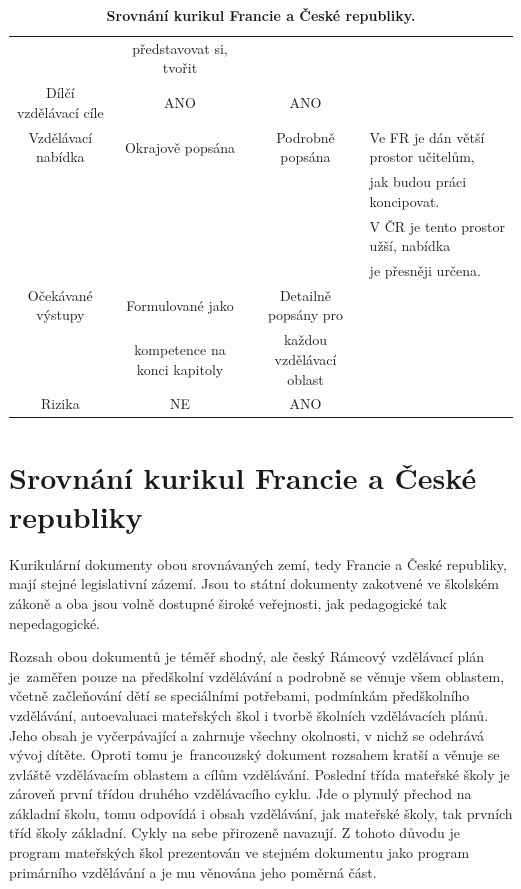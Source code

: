 \begin{landscape}
\begin{table}[t]
\begin{tabular}{|c|c|c|l|}
\rowcolor{grey!10}
					& představovat si, tvořit 	&						& 	\\		
\rowcolor{grey!50}
Dílčí vzdělávací cíle	& ANO					& ANO 					& 	\\	
\rowcolor{grey!10}
Vzdělávací nabídka	& Okrajově popsána	 		& Podrobně popsána	 	& Ve FR je dán větší prostor učitelům, 	\\
\rowcolor{grey!10}
					&							&						& jak budou práci koncipovat. 			\\
\rowcolor{grey!10}
					&							&						& V ČR je tento prostor užší, nabídka 	\\
\rowcolor{grey!10}
					&							&						& je přesněji určena. 					\\
\rowcolor{grey!50}
Očekávané výstupy	& Formulované jako 				& Detailně popsány pro 		& 		\\ 
\rowcolor{grey!50}
					& kompetence na konci kapitoly 	& každou vzdělávací oblast 	& 		\\
\rowcolor{grey!10}
Rizika	 			& NE						& ANO	 						& 		\\
\hline
\end{tabular}
\caption{ \textbf{Srovnání kurikul Francie a České republiky.}
}
\label{tab:srovnaniKurikul}
\end{table}
\end{landscape}

\section{Srovnání kurikul Francie a České republiky}
\label{srovnanikurikulfrcr}

	Kurikulární dokumenty obou srovnávaných zemí, tedy Francie a České republiky, mají stejné legislativní zázemí. Jsou to státní dokumenty zakotvené ve školském zákoně a oba jsou volně dostupné široké veřejnosti, jak pedagogické tak nepedagogické. 

	Rozsah obou dokumentů je téměř shodný, ale český Rámcový vzdělávací plán je zaměřen pouze na předškolní vzdělávání a podrobně se věnuje všem oblastem, včetně začleňování dětí se speciálními potřebami, podmínkám předškolního vzdělávání, autoevaluaci mateřských škol i tvorbě školních vzdělávacích plánů. Jeho obsah je vyčerpávající a zahrnuje všechny okolnosti, v nichž se odehrává vývoj dítěte. Oproti tomu je francouzský dokument rozsahem kratší a věnuje se zvláště vzdělávacím oblastem a cílům vzdělávání. Poslední třída mateřské školy je zároveň první třídou druhého vzdělávacího cyklu. Jde o plynulý přechod na základní školu, tomu odpovídá i obsah vzdělávání, jak mateřské školy, tak prvních tříd školy základní. Cykly na sebe přirozeně navazují. Z tohoto důvodu je program mateřských škol prezentován ve stejném dokumentu jako program primárního vzdělávání a je mu věnována jeho poměrná část.

